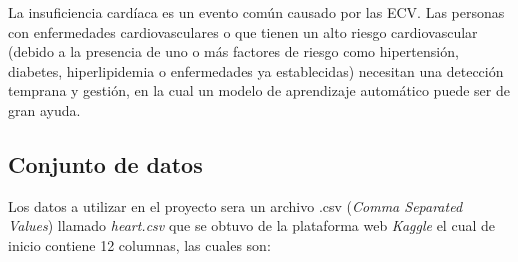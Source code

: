 \documentclass[12pt, letterpaper]{article}
\begin{document}
La insuficiencia cardíaca es un evento común causado por las ECV.
Las personas con enfermedades cardiovasculares o que tienen un alto riesgo cardiovascular 
(debido a la presencia de uno o más factores de riesgo como hipertensión, diabetes, 
hiperlipidemia o enfermedades ya establecidas) necesitan una detección temprana y gestión, 
en la cual un modelo de aprendizaje automático puede ser de gran ayuda. 
\cite*{dataset}

\subsection{Conjunto de datos}
Los datos a utilizar en el proyecto sera un archivo .csv 
(\textit{Comma Separated Values}) llamado \textit{heart.csv} 
que se obtuvo de la plataforma web \textit{Kaggle} \cite{dataset}
el cual de inicio contiene 12 columnas, las cuales son:
\end{document}
